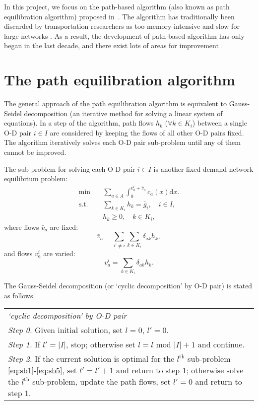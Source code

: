 In this project, we focus on the path-based algorithm (also known as path equilibration algorithm) proposed in~\citet{Dafermos1969}.
The algorithm has traditionally been discarded by transportation researchers as too memory-intensive and slow for large networks \citep{Jayakrishnan1994}.
As a result, the development of path-based algorithm has only began in the last decade, and there exist lots of areas for improvement \citep{Olga2013}.

\section{The path equilibration algorithm}
The general approach of the path equilibration algorithm is equivalent to
Gauss-Seidel decomposition (an iterative method for solving a linear system of equations).
In a step of the algorithm,
path flows $h_k$ ($\forall k \in K_i$) between a single O-D pair $i \in I$ are considered by keeping the flows of all other O-D pairs fixed.
The algorithm iteratively solves each O-D pair sub-problem until any of them cannot be improved.

The sub-problem for solving each O-D pair $i \in I$ is another fixed-demand network equilibrium problem:
\begin{align} \label{eq:sb1}
    \min & \quad \sum_{a \in A} \int_0^{v_a^i + \bar{v}_a} c_a(x) \mathrm{d} x.\\
    \text{s.t.} &\quad \sum_{k \in K_i} h_k = \bar{g}_i, \quad i \in I, \\
    & \quad h_k \geq 0, \quad k \in K_i,
\end{align}
where flows $\bar{v}_a$ are fixed:
\begin{equation}
    \bar{v}_a = \sum_{i' \neq i} \sum_{k \in K_i} \delta_{ak} h_k,
\end{equation}
and flows $v_a^i$ are varied:
\begin{equation} \label{eq:sb5}
    v_a^i = \sum_{k \in K_i} \delta_{ak} h_k.
\end{equation}


\newpage
The Gauss-Seidel decomposition (or `cyclic decomposition' by O-D pair) is stated as follows.
\begin{table}[H]
    \begin{tabular}{ m{} }
        \hspace{-.5cm}\emph{`cyclic decomposition' by O-D pair} \citep{Florian} \\
        \emph{Step 0.} Given initial solution, set $l = 0$, $l' = 0$.\\
        \emph{Step 1.} If $l' = |I|$, stop; otherwise set $l = l \text{ mod } |I| + 1$ and continue.\\
        \emph{Step 2.} If the current solution is optimal for the $l^\text{th}$ sub-problem \eqref{eq:sb1}-\eqref{eq:sb5}, set $l' = l' + 1$ and return to step 1; otherwise solve the $l^\text{th}$ sub-problem, update the path flows, set $l' = 0$ and return to step 1.\\
    \end{tabular}
\end{table}

